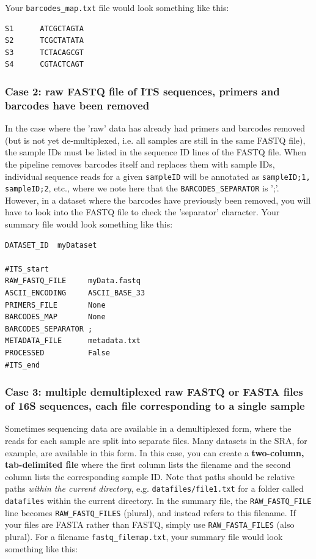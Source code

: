 \documentclass[11pt, oneside]{article}   	%
\begin{document}
Your {\tt barcodes\_map.txt} file would look something like this:

\begin{verbatim}
S1      ATCGCTAGTA
S2      TCGCTATATA
S3      TCTACAGCGT
S4      CGTACTCAGT
\end{verbatim}

\subsubsection{Case 2: raw FASTQ file of ITS sequences, primers and barcodes have been removed}
In the case where the 'raw' data has already had primers and barcodes removed (but is not yet de-multiplexed, i.e. all samples are still in the same FASTQ file), the sample IDs must be listed in the sequence ID lines of the FASTQ file.  When the pipeline removes barcodes itself and replaces them with sample IDs, individual sequence reads for a given {\tt sampleID} will be annotated as {\tt sampleID;1, sampleID;2}, etc., where we note here that the {\tt BARCODES\_SEPARATOR} is ';'.  However, in a dataset where the barcodes have previously been removed, you will have to look into the FASTQ file to check the 'separator' character.  Your summary file would look something like this:

\begin{verbatim}
DATASET_ID	myDataset

#ITS_start
RAW_FASTQ_FILE     myData.fastq
ASCII_ENCODING     ASCII_BASE_33
PRIMERS_FILE       None
BARCODES_MAP       None
BARCODES_SEPARATOR ;
METADATA_FILE      metadata.txt
PROCESSED          False
#ITS_end
\end{verbatim}
		
\subsubsection{Case 3: multiple demultiplexed raw FASTQ or FASTA files of 16S sequences, each file corresponding to a single sample}
Sometimes sequencing data are available in a demultiplexed form, where the reads for each sample are split into separate files.  Many datasets in the SRA, for example, are available in this form.  In this case, you can create a \textbf{two-column, tab-delimited file} where the first column lists the filename and the second column lists the corresponding sample ID.  Note that paths should be relative paths \textit{within the current directory}, e.g. {\tt datafiles/file1.txt} for a folder called {\tt datafiles} within the current directory.  In the summary file, the {\tt RAW\_FASTQ\_FILE} line becomes {\tt RAW\_FASTQ\_FILES} (plural), and instead refers to this filename.  If your files are FASTA rather than FASTQ, simply use {\tt RAW\_FASTA\_FILES} (also plural).  For a filename {\tt fastq\_filemap.txt}, your summary file would look something like this:
\end{document}
